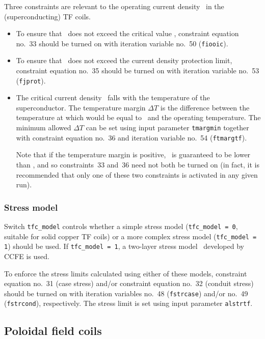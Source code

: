 \documentclass[11pt,a4paper]{report}
\begin{document}
Three constraints are relevant to the operating current density \jop\ in the
(superconducting) TF coils.
\begin{itemize}

\item To ensure that \jop\ does not exceed the critical value \jcrit, constraint
  equation no.\ 33 should be turned on with iteration variable no.\ 50
  (\texttt{fiooic}).

\item To ensure that \jop\ does not exceed the current density protection limit,
  constraint equation no.\ 35 should be turned on with iteration variable no.\
  53 (\texttt{fjprot}).

\item The critical current density \jcrit\ falls with the temperature of the
  superconductor. The temperature margin $\Delta T$ is the difference between the
  temperature at which \jcrit would be equal to \jop\ and the operating
  temperature. The minimum allowed $\Delta T$ can be set using input parameter
  \texttt{tmargmin} together with constraint equation no.\ 36 and iteration
  variable no.\ 54 (\texttt{ftmargtf}).

  Note that if the temperature margin is positive, \jop\ is guaranteed to be
  lower than \jcrit, and so constraints~33 and~36 need not both be turned on
  (in fact, it is recommended that only one of these two constraints is
  activated in any given run).

\end{itemize}

\subsubsection{Stress model}

Switch \texttt{tfc\_model} controls whether a simple stress model
(\texttt{tfc\_model = 0}, suitable for solid copper TF coils) or a more
complex stress model (\texttt{tfc\_model = 1}) should be used. If
\texttt{tfc\_model = 1}, a two-layer stress model~\cite{Morris_tfc} developed
by CCFE is used.

To enforce the stress limits calculated using either of these models,
constraint equation no.\ 31 (case stress) and/or constraint equation no.\ 32
(conduit stress) should be turned on with iteration variables no.\ 48
(\texttt{fstrcase}) and/or no.\ 49 (\texttt{fstrcond}), respectively. The
stress limit is set using input parameter \texttt{alstrtf}.

\subsection{Poloidal field coils}
\label{sec:pfcoils}
\end{document}
